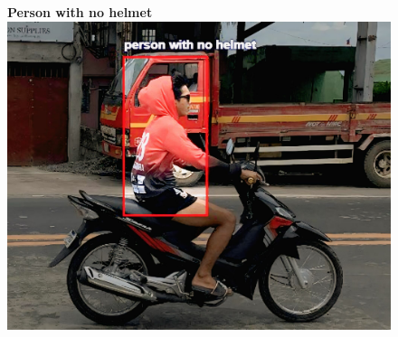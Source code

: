 \begin{refsection}
\begin{figure}[H]
\begin{minipage}{0.3\textwidth}
\end{minipage}\hfill
\begin{minipage}{0.3\textwidth}
\centering
\textbf{Person with no helmet} \\
\includegraphics[width=\linewidth]{figures/Fig 19c.jpg}
\end{minipage}

\vspace{0.5cm}


\end{figure}
\end{refsection}
